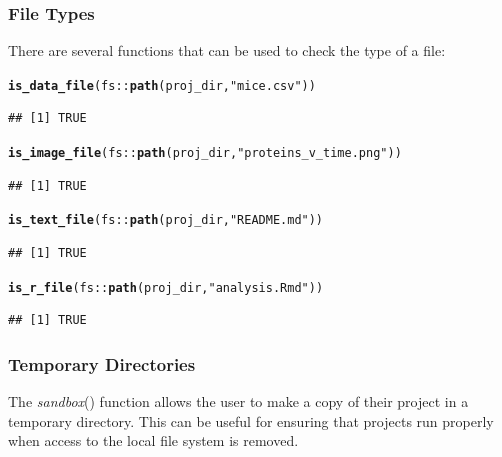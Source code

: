 \documentclass[APA,LATO1COL]{WileyNJD-v2}\usepackage[]{graphicx}\usepackage[]{color}
\makeatletter
\newcommand{\hlstr}[1]{\textcolor[rgb]{0.192,0.494,0.8}{#1}}%
\newcommand{\hlopt}[1]{\textcolor[rgb]{0,0,0}{#1}}%
\newcommand{\hlstd}[1]{\textcolor[rgb]{0.345,0.345,0.345}{#1}}%
\newcommand{\hlkwd}[1]{\textcolor[rgb]{0.737,0.353,0.396}{\textbf{#1}}}%
\newenvironment{kframe}{%
 \def\at@end@of@kframe{}%
 \ifinner\ifhmode%
  \def\at@end@of@kframe{\end{minipage}}%
  \begin{minipage}{\columnwidth}%
 \fi\fi%
 \def\FrameCommand##1{\hskip\@totalleftmargin \hskip-\fboxsep
 \colorbox{shadecolor}{##1}\hskip-\fboxsep
     \hskip-\linewidth \hskip-\@totalleftmargin \hskip\columnwidth}%
 \MakeFramed {\advance\hsize-\width
   \@totalleftmargin\z@ \linewidth\hsize
   \@setminipage}}%
 {\par\unskip\endMakeFramed%
 \at@end@of@kframe}
\newenvironment{knitrout}{}{} %
\newcommand{\func}[1]{\textit{#1}()}
\makeatother
\begin{document}
\subsubsection{File Types}

There are several functions that can be used to check the type of a file: 


\begin{knitrout}
\color{fgcolor}\begin{kframe}
\begin{alltt}
\hlkwd{is_data_file}\hlstd{(fs}\hlopt{::}\hlkwd{path}\hlstd{(proj_dir,} \hlstr{"mice.csv"}\hlstd{))}
\end{alltt}
\begin{verbatim}
## [1] TRUE
\end{verbatim}
\begin{alltt}
\hlkwd{is_image_file}\hlstd{(fs}\hlopt{::}\hlkwd{path}\hlstd{(proj_dir,} \hlstr{"proteins_v_time.png"}\hlstd{))}
\end{alltt}
\begin{verbatim}
## [1] TRUE
\end{verbatim}
\begin{alltt}
\hlkwd{is_text_file}\hlstd{(fs}\hlopt{::}\hlkwd{path}\hlstd{(proj_dir,} \hlstr{"README.md"}\hlstd{))}
\end{alltt}
\begin{verbatim}
## [1] TRUE
\end{verbatim}
\begin{alltt}
\hlkwd{is_r_file}\hlstd{(fs}\hlopt{::}\hlkwd{path}\hlstd{(proj_dir,} \hlstr{"analysis.Rmd"}\hlstd{))}
\end{alltt}
\begin{verbatim}
## [1] TRUE
\end{verbatim}
\end{kframe}
\end{knitrout}

\subsubsection{Temporary Directories}

The \func{sandbox} function allows the user to make a copy of their project in a temporary directory. This can be useful for ensuring that projects run properly when access to the local file system is removed.
\end{document}
